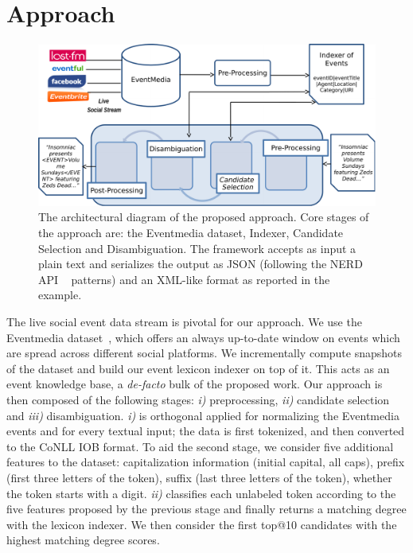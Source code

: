 \documentclass[10pt,a4paper]{article}
\begin{document}
\section{Approach}
\begin{figure}
\includegraphics[width=\textwidth]{architecture.pdf}
\caption{The architectural diagram of the proposed approach. Core stages of the approach are: the Eventmedia dataset, Indexer, Candidate Selection and Disambiguation. The framework accepts as input a plain text and serializes the output as JSON (following the NERD API ~\cite{RIZZO:2012} patterns) and an XML-like format as reported in the example.}
\label{fig:architecture}
\end{figure}
The live social event data stream is pivotal for our approach. We use the Eventmedia dataset~\cite{krouf2012}, which offers an always up-to-date window on events which are spread across different social platforms. We incrementally compute snapshots of the dataset and build our event lexicon indexer on top of it. This acts as an event knowledge base, a \textit{de-facto} bulk of the proposed work. Our approach is then composed of the following stages: \textit{i)} preprocessing, \textit{ii)} candidate selection and \textit{iii)} disambiguation. \textit{i)} is orthogonal applied for normalizing the Eventmedia events and for every textual input; the data is first tokenized, and then converted to the CoNLL IOB format. To aid the second stage, we consider five additional features to the dataset: capitalization information (initial capital, all caps), prefix (first three letters of the token), suffix (last three letters of the token), whether the token starts with a digit.
\textit{ii)} classifies each unlabeled token according to the five features proposed by the previous stage and finally returns a matching degree with the lexicon indexer. We then consider the first top@10 candidates with the highest matching degree scores.
\end{document}
